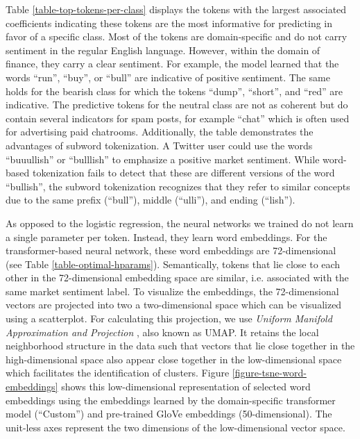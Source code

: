 Table \ref{table-top-tokens-per-class} displays the tokens with the largest associated coefficients indicating these tokens are the most informative for predicting in favor of a specific class. Most of the tokens are domain-specific and do not carry sentiment in the regular English language. However, within the domain of finance, they carry a clear sentiment. For example, the model learned that the words ``run'', ``buy'', or ``bull'' are indicative of positive sentiment. The same holds for the bearish class for which the tokens ``dump'', ``short'', and ``red'' are indicative. The predictive tokens for the neutral class are not as coherent but do contain several indicators for spam posts, for example ``chat'' which is often used for advertising paid chatrooms. Additionally, the table demonstrates the advantages of subword tokenization. A Twitter user could use the words ``buuullish'' or ``bulllish'' to emphasize a positive market sentiment. While word-based tokenization fails to detect that these are different versions of the word ``bullish'', the subword tokenization recognizes that they refer to similar concepts due to the same prefix (``bull''), middle (``ulli''), and ending (``lish'').



As opposed to the logistic regression, the neural networks we trained do not learn a single parameter per token. Instead, they learn word embeddings. For the transformer-based neural network, these word embeddings are 72-dimensional (see Table \ref{table-optimal-hparams}). Semantically, tokens that lie close to each other in the 72-dimensional embedding space are similar, i.e. associated with the same market sentiment label. To visualize the embeddings, the 72-dimensional vectors are projected into two a two-dimensional space which can be visualized using a scatterplot. For calculating this projection, we use \emph{Uniform Manifold Approximation and Projection} , also known as UMAP. It retains the local neighborhood structure in the data such that vectors that lie close together in the high-dimensional space also appear close together in the low-dimensional space which facilitates the identification of clusters. Figure \ref{figure-tsne-word-embeddings} shows this low-dimensional representation of selected word embeddings using the embeddings learned by the domain-specific transformer model (``Custom'') and pre-trained GloVe embeddings (50-dimensional). The unit-less axes represent the two dimensions of the low-dimensional vector space.

